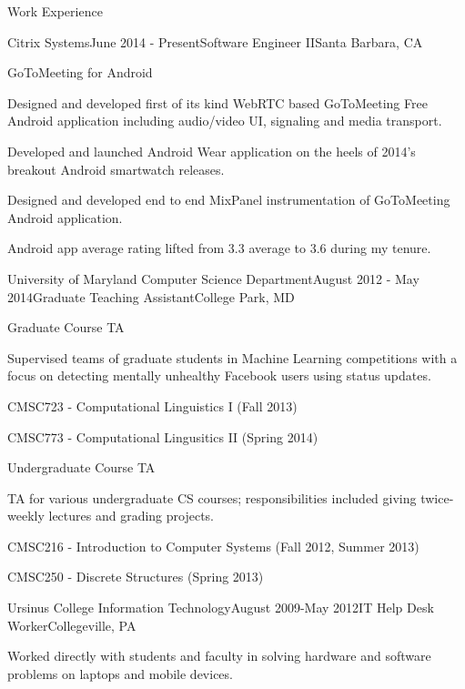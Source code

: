 \documentclass{resume} %
\begin{document}
\begin{rSection}{Work Experience}
\begin{rSubsection}{Citrix Systems}{June 2014 - Present}{Software Engineer II}{Santa Barbara, CA}
\item
\begin{rWorkProject}{GoToMeeting for Android}
\item Designed and developed first of its kind WebRTC based GoToMeeting Free Android application including \newline audio/video UI, signaling and media transport.
\item Developed and launched Android Wear application on the heels of 2014's breakout Android smartwatch releases.
\item Designed and developed end to end MixPanel instrumentation of GoToMeeting Android application.
\item Android app average rating lifted from 3.3 average to 3.6 during my tenure.
\end{rWorkProject}
\end{rSubsection}
\begin{rSubsection}{University of Maryland Computer Science Department}{August 2012 - May 2014}{Graduate Teaching Assistant}{College Park, MD}
\item
\begin{rWorkProject}{Graduate Course TA}
\item Supervised teams of graduate students in Machine Learning competitions with a focus on detecting mentally unhealthy Facebook users using status updates.
\item CMSC723 - Computational Linguistics I (Fall 2013)
\item CMSC773 - Computational Lingusitics II (Spring 2014)
\end{rWorkProject}
\item
\begin{rWorkProject}{Undergraduate Course TA}
\item TA for various undergraduate CS courses; responsibilities included giving twice-weekly lectures and grading projects.
\item CMSC216 - Introduction to Computer Systems (Fall 2012, Summer 2013)
\item CMSC250 - Discrete Structures (Spring 2013)
\end{rWorkProject}
\end{rSubsection}

\begin{rSubsection}{Ursinus College Information Technology}{August 2009-May 2012}{IT Help Desk Worker}{Collegeville, PA}
\item Worked directly with students and faculty in solving hardware and software problems on laptops and mobile devices. 
\end{rSubsection}
\end{rSection}
\end{document}
